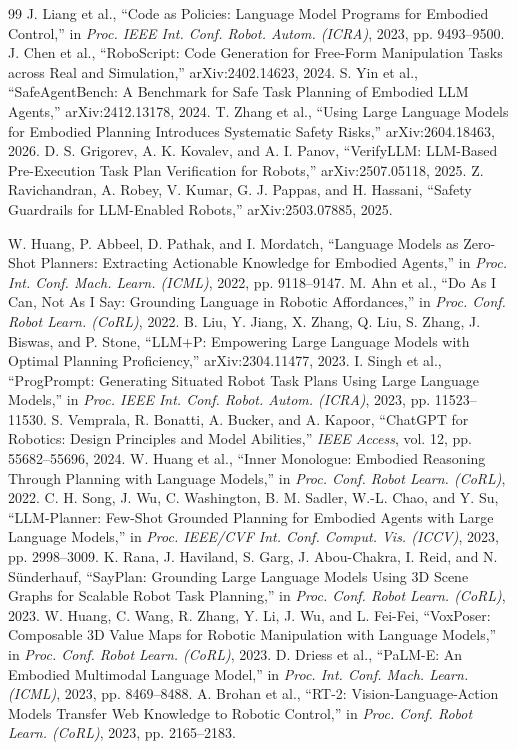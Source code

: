 \begin{thebibliography}{99}\scriptsize
{} J. Liang et al., ``Code as Policies: Language Model Programs for Embodied Control,'' in \emph{Proc. IEEE Int. Conf. Robot. Autom. (ICRA)}, 2023, pp. 9493--9500.
 J. Chen et al., ``RoboScript: Code Generation for Free-Form Manipulation Tasks across Real and Simulation,'' arXiv:2402.14623, 2024.
 S. Yin et al., ``SafeAgentBench: A Benchmark for Safe Task Planning of Embodied LLM Agents,'' arXiv:2412.13178, 2024.
 T. Zhang et al., ``Using Large Language Models for Embodied Planning Introduces Systematic Safety Risks,'' arXiv:2604.18463, 2026.
 D. S. Grigorev, A. K. Kovalev, and A. I. Panov, ``VerifyLLM: LLM-Based Pre-Execution Task Plan Verification for Robots,'' arXiv:2507.05118, 2025.
 Z. Ravichandran, A. Robey, V. Kumar, G. J. Pappas, and H. Hassani, ``Safety Guardrails for LLM-Enabled Robots,'' arXiv:2503.07885, 2025.

 W. Huang, P. Abbeel, D. Pathak, and I. Mordatch, ``Language Models as Zero-Shot Planners: Extracting Actionable Knowledge for Embodied Agents,'' in \emph{Proc. Int. Conf. Mach. Learn. (ICML)}, 2022, pp. 9118--9147.
 M. Ahn et al., ``Do As I Can, Not As I Say: Grounding Language in Robotic Affordances,'' in \emph{Proc. Conf. Robot Learn. (CoRL)}, 2022.
 B. Liu, Y. Jiang, X. Zhang, Q. Liu, S. Zhang, J. Biswas, and P. Stone, ``LLM+P: Empowering Large Language Models with Optimal Planning Proficiency,'' arXiv:2304.11477, 2023.
 I. Singh et al., ``ProgPrompt: Generating Situated Robot Task Plans Using Large Language Models,'' in \emph{Proc. IEEE Int. Conf. Robot. Autom. (ICRA)}, 2023, pp. 11523--11530.
 S. Vemprala, R. Bonatti, A. Bucker, and A. Kapoor, ``ChatGPT for Robotics: Design Principles and Model Abilities,'' \emph{IEEE Access}, vol. 12, pp. 55682--55696, 2024.
 W. Huang et al., ``Inner Monologue: Embodied Reasoning Through Planning with Language Models,'' in \emph{Proc. Conf. Robot Learn. (CoRL)}, 2022.
 C. H. Song, J. Wu, C. Washington, B. M. Sadler, W.-L. Chao, and Y. Su, ``LLM-Planner: Few-Shot Grounded Planning for Embodied Agents with Large Language Models,'' in \emph{Proc. IEEE/CVF Int. Conf. Comput. Vis. (ICCV)}, 2023, pp. 2998--3009.
 K. Rana, J. Haviland, S. Garg, J. Abou-Chakra, I. Reid, and N. S\"underhauf, ``SayPlan: Grounding Large Language Models Using 3D Scene Graphs for Scalable Robot Task Planning,'' in \emph{Proc. Conf. Robot Learn. (CoRL)}, 2023.
 W. Huang, C. Wang, R. Zhang, Y. Li, J. Wu, and L. Fei-Fei, ``VoxPoser: Composable 3D Value Maps for Robotic Manipulation with Language Models,'' in \emph{Proc. Conf. Robot Learn. (CoRL)}, 2023.
 D. Driess et al., ``PaLM-E: An Embodied Multimodal Language Model,'' in \emph{Proc. Int. Conf. Mach. Learn. (ICML)}, 2023, pp. 8469--8488.
 A. Brohan et al., ``RT-2: Vision-Language-Action Models Transfer Web Knowledge to Robotic Control,'' in \emph{Proc. Conf. Robot Learn. (CoRL)}, 2023, pp. 2165--2183.


\end{thebibliography}
